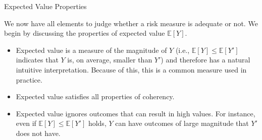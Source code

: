 \documentclass[9pt]{beamer}
\begin{document}
%
\begin{frame}{Expected Value Properties}

We now have all elements to judge whether a risk measure is adequate or not.  We begin by discussing the properties of expected value $\mathbb{E}[Y]$.

\begin{itemize}
\item Expected value is a measure of the magnitude of $Y$ (i.e., $\mathbb{E}[Y]\leq \mathbb{E}[Y']$ indicates that $Y$ is, on average, smaller than $Y'$) and therefore has a natural intuitive interpretation.  Because of this, this is a common measure used in practice. 

\item Expected value satisfies all properties of coherency. 

\item Expected value ignores outcomes that can result in high values. For instance, even if $\mathbb{E}[Y]\leq \mathbb{E}[Y']$ holds, $Y$ can have outcomes of large magnitude that $Y'$ does not have. 

\end{itemize}


\end{frame}
\end{document}
